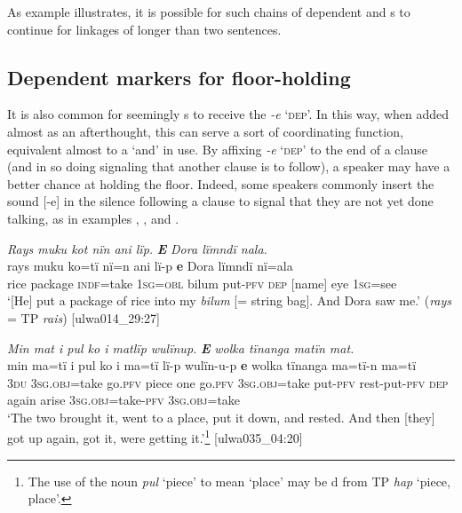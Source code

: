 As example  illustrates, it is possible for such chains of dependent and s to continue for linkages of longer than two sentences.


\subsection{Dependent markers for floor-holding}\label{sec:12.2.6}


It is also common for seemingly s to receive the  \textit{-e} ‘\textsc{dep}’. In this way, when added almost as an afterthought, this  can serve a sort of coordinating function, equivalent almost to a  ‘and’ in use. By affixing \textit{-e} ‘\textsc{dep}’ to the end of a clause (and in so doing signaling that another clause is to follow), a speaker may have a better chance at holding the floor. Indeed, some speakers commonly insert the sound [-e] in the silence following a clause to signal that they are not yet done talking, as in examples , , and .

\ea%
    \label{ex:complex:72}
          \textit{Rays muku kot nïn ani lïp.} \textbf{\textit{E}} \textit{Dora lïmndï nala.}\\
\gll    rays  muku    ko=tï    nï=n    ani    lï-p      \textbf{e}     Dora  lïmndï  nï=ala\\
    rice  package  \textsc{indf}=take  1\textsc{sg=obl}  bilum  put-\textsc{pfv}  \textsc{dep}    [name]  eye    1\textsc{sg}=see\\
\glt `[He] put a package of rice into my \textit{bilum} [= string bag]. And Dora saw me.’ (\textit{rays} = TP \textit{rais}) [ulwa014\_29:27]
\z

\ea%
    \label{ex:complex:73}
          \textit{Min mat i pul ko i matlïp wulïnup.} \textbf{\textit{E}} \textit{wolka tïnanga matïn mat.}\\
\gll    min  ma=tï      i    pul    ko  i    ma=tï lï-p      wulïn-u-p    \textbf{e}    wolka  tïnanga  ma=tï-n     ma=tï\\
    3\textsc{du}  3\textsc{sg.obj}=take  go.\textsc{pfv}  piece  one  go.\textsc{pfv}  \textsc{3sg.obj=}take    put\textsc{{}-pfv} rest-put-\textsc{pfv}  \textsc{dep}  again  arise  3\textsc{sg.obj}=take-\textsc{pfv}    3\textsc{sg.obj}=take\\
\glt `The two brought it, went to a place, put it down, and rested. And then [they] got up again, got it, were getting it.’\footnote{The use of the noun \textit{pul} ‘piece’ to mean ‘place’ may be d from TP \textit{hap} ‘piece, place’.} [ulwa035\_04:20]
\z

